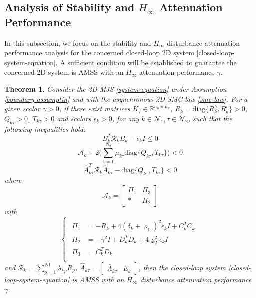 \documentclass[journal,final,twocolumn]{IEEEtran}
\newtheorem{theorem}{Theorem}
\begin{document}
\subsection{Analysis of Stability and $H_{\infty}$ Attenuation Performance } \label{stability&H_infty}
 In this subsection, we focus on the stability and $H_{\infty}$ disturbance attenuation performance analysis for the concerned closed-loop 2D system \eqref{closed-loop-system-equation}. A sufficient condition will be established to guarantee the concerned 2D system is  AMSS with an $H_{\infty}$ attenuation performance $\gamma$.
\begin{theorem}\label{theorem1}
	Consider the  2D-MJS \eqref{system-equation} under Assumption \eqref{boundary-assumptin} and with the asynchronous 2D-SMC law \eqref{smc-law}. For a given scalar $\gamma>0$, if there exist matrices $K_{\tau }\in\mathbb{R}^{n_u\times n_x}$,  $R_{k}=\mathrm{diag}\{R^{h}_{k},R^{v}_{k}\}>0$,  $Q_{k\tau }>0$, $T_{k\tau }>0$ and scalars $\epsilon_{k}>0$, for any $k\in\mathcal{N}_{1}, \tau\in\mathcal{N}_{2}$,  such that the following inequalities hold: 
	\begin{equation}\label{T1C1}
	B^{T}_{k}  	\mathcal{R}_{k} B_{k} -\epsilon_{k}I \leq 0
	\end{equation}
	\begin{equation}\label{T1C2}
	\mathcal{A}_{k} +2\Big(\sum_{\tau =1}^{N_{2}}\mu_{k\tau } \mathrm{diag}\{Q_{k\tau }, T_{k\tau }\}\Big) < 0
	\end{equation}
	\begin{equation}\label{T1C3}
	\hat{A}^{T}_{k\tau }\mathcal{R}_{k}\hat{A}_{k\tau } - \mathrm{diag}\{Q_{k\tau }, T_{k\tau }\} < 0
	\end{equation}
	where
	\begin{equation*}
	\mathcal{A}_{k}=\begin{bmatrix}
	\varPi_{1} & \varPi_{3}\\
	*&\varPi_{2}
	\end{bmatrix}
	\end{equation*} with
	\begin{equation*} \label{varPi}
	\left\{
	\begin{array}{lr}
	\begin{split}
	\varPi_{1}&=-R_{k}+4(\delta_{k}+\varrho_{1})^{2}\epsilon_{k}I+C^{T}_{k}C_{k}\\
	\varPi_{2}&=-\gamma^{2}I+D^{T}_{k}D_{k}+4\varrho_{2}^{2}\epsilon_{k}I\\
	\varPi_{3}&= C_{k}^{T}D_{k}\\
	\end{split}
	\end{array}
	\right.
	\end{equation*}
	and $\mathcal{R}_{k}=\sum_{p=1}^{N1}\lambda_{kp}R_{p}$, $\hat{A}_{k\tau }=\begin{bmatrix}
	\bar{A}_{k\tau }& E_{k}
	\end{bmatrix}$, 
	then the closed-loop system \eqref{closed-loop-system-equation} is AMSS with an $H_{\infty}$ disturbance attenuation performance $\gamma$.
\end{theorem}
\end{document}
